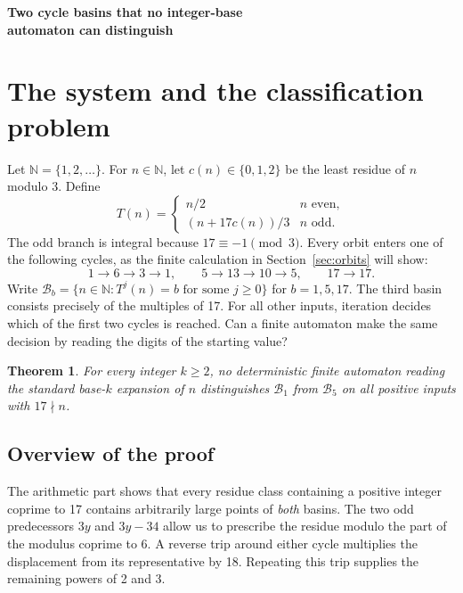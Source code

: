 \documentclass[11pt,a4paper]{article}
\newtheorem{theorem}{Theorem}
\newcommand{\N}{\mathbb N}
\newcommand{\B}{\mathcal B}
\begin{document}
\thispagestyle{plain}
\begin{center}
{\Large\bfseries Two cycle basins that no integer-base\\[3pt] automaton can distinguish\par}
\end{center}

\section{The system and the classification problem}
Let $\N=\{1,2,\ldots\}$. For $n\in\N$, let $c(n)\in\{0,1,2\}$ be the least residue of $n$ modulo 3. Define
\begin{equation}\label{eq:map}
 T(n)=\begin{cases}
 n/2 & n\text{ even},\\[2pt]
 (n+17c(n))/3 & n\text{ odd}.
 \end{cases}
\end{equation}
The odd branch is integral because $17\equiv-1\pmod3$. Every orbit enters one of the following cycles, as the finite calculation in Section~\ref{sec:orbits} will show:
\[
 1\longrightarrow 6\longrightarrow 3\longrightarrow 1,\qquad
 5\longrightarrow 13\longrightarrow 10\longrightarrow 5,\qquad
 17\longrightarrow17.
\]
Write $\B_b=\{n\in\N:T^j(n)=b\text{ for some }j\ge0\}$ for $b=1,5,17$.
The third basin consists precisely of the multiples of 17. For all other inputs, iteration decides which of the first two cycles is reached. Can a finite automaton make the same decision by reading the digits of the starting value?

\begin{theorem}\label{th:main}
For every integer $k\ge2$, no deterministic finite automaton reading the standard base-$k$ expansion of $n$ distinguishes $\B_1$ from $\B_5$ on all positive inputs with $17\nmid n$.
\end{theorem}

\subsection*{Overview of the proof}
The arithmetic part shows that every residue class containing a positive integer coprime to 17 contains arbitrarily large points of \emph{both} basins. The two odd predecessors $3y$ and $3y-34$ allow us to prescribe the residue modulo the part of the modulus coprime to 6. A reverse trip around either cycle multiplies the displacement from its representative by 18. Repeating this trip supplies the remaining powers of 2 and 3.
\end{document}

